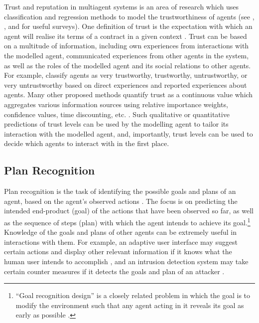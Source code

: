 \documentclass[final,1p,times,authoryear]{elsarticle}
\begin{document}
Trust and reputation in multiagent systems is an area of research which uses classification and regression methods to model the trustworthiness of agents (see \citet{ps2013}, \citet{yslml2013}, and \citet{rhj2004} for useful surveys). One definition of trust is the expectation with which an agent will realise its terms of a contract in a given context \citep[many other definitions exist, e.g.][]{d2000}. Trust can be based on a multitude of information, including own experiences from interactions with the modelled agent, communicated experiences from other agents in the system, as well as the roles of the modelled agent and its social relations to other agents. For example, \citet{ah2000} classify agents as very trustworthy, trustworthy, untrustworthy, or very untrustworthy based on direct experiences and reported experiences about agents. Many other proposed methods quantify trust as a continuous value which aggregates various information sources using relative importance weights, confidence values, time discounting, etc. \citep[e.g.][]{hjs2006,mmh2002,ss2001,sfr2000}. Such qualitative or quantitative predictions of trust levels can be used by the modelling agent to tailor its interaction with the modelled agent, and, importantly, trust levels can be used to decide which agents to interact with in the first place.


		\subsection{\bf Plan Recognition} \label{sec:planrec}

Plan recognition is the task of identifying the possible goals and plans of an agent, based on the agent's observed actions \citep{c2001}. The focus is on predicting the intended end-product (goal) of the actions that have been observed so far, as well as the sequence of steps (plan) with which the agent intends to achieve its goal.\footnote{``Goal recognition design'' is a closely related problem in which the goal is to modify the environment such that any agent acting in it reveals its goal as early as possible \citep{why2017,kgk2016,kgk2015,kgk2014}.} Knowledge of the goals and plans of other agents can be extremely useful in interactions with them. For example, an adaptive user interface may suggest certain actions and display other relevant information if it knows what the human user intends to accomplish \citep{oh2011,m1993}, and an intrusion detection system may take certain counter measures if it detects the goals and plan of an attacker \citep{gg2001}.
\end{document}
